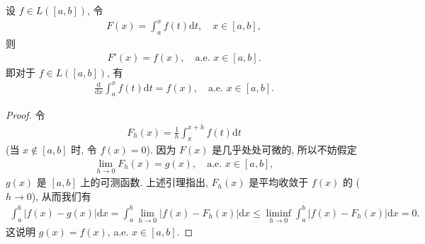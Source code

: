 \documentclass[../../main.tex]{subfiles}%
\begin{document}
\begin{theorem}
设 $f\in L([a,b])$, 令
\begin{align*}
F(x) = \int_a^x f(t)\mathrm{d}t, \quad x\in[a,b],
\end{align*}
则
\begin{align*}
F'(x) = f(x), \quad \text{a.e. } x\in[a,b].
\end{align*}
即对于 $f\in L([a,b])$, 有
\begin{align*}
\frac{\mathrm{d}}{\mathrm{d}x}\int_a^x f(t)\mathrm{d}t = f(x), \quad \text{a.e. } x\in[a,b].
\end{align*}
\end{theorem}
\begin{proof}

令
\begin{align*}
F_h(x) = \frac{1}{h}\int_x^{x+h} f(t)\mathrm{d}t
\end{align*}
(当 $x\notin [a,b]$ 时, 令 $f(x)=0$). 因为 $F(x)$ 是几乎处处可微的, 所以不妨假定
\begin{align*}
\lim_{h\to 0} F_h(x) = g(x), \quad \text{a.e. } x\in[a,b],
\end{align*}
$g(x)$ 是 $[a,b]$ 上的可测函数. 上述引理指出, $F_h(x)$ 是平均收敛于 $f(x)$ 的 ($h\to 0$), 从而我们有
\begin{align*}
\int_a^b |f(x)-g(x)|\mathrm{d}x = \int_a^b \lim_{h\to 0} |f(x)-F_h(x)|\mathrm{d}x \leqslant \liminf_{h\to 0} \int_a^b |f(x)-F_h(x)|\mathrm{d}x = 0.
\end{align*}
这说明 $g(x)=f(x)$, a.e. $x\in[a,b]$.

\end{proof}
\end{document}
